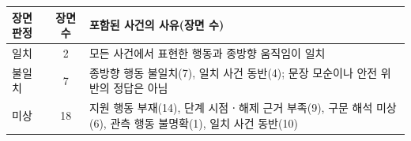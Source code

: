 \begin{table}[t]
\centering
\color{revisionblue}
\label{tab:trajectory-cases}
\footnotesize
\begin{tabularx}{\columnwidth}{lcY}
\toprule
장면 판정 & 장면 수 & 포함된 사건의 사유(장면 수) \\
\midrule
일치 & 2 & 모든 사건에서 표현한 행동과 종방향 움직임이 일치 \\
불일치 & 7 & 종방향 행동 불일치(7), 일치 사건 동반(4); 문장 모순이나 안전 위반의 정답은 아님 \\
미상 & 18 & 지원 행동 부재(14), 단계 시점ㆍ해제 근거 부족(9), 구문 해석 미상(6), 관측 행동 불명확(1), 일치 사건 동반(10) \\
\bottomrule
\end{tabularx}
\end{table}
